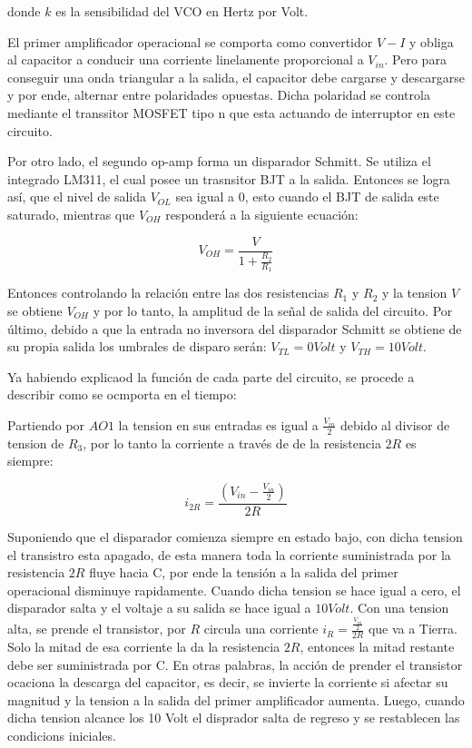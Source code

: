 donde $k$ es la sensibilidad del VCO en Hertz por Volt. 


El primer amplificador operacional se comporta como convertidor $V-I$ y obliga al capacitor a conducir una corriente linelamente proporcional a $V_{in}$. Pero para conseguir una onda triangular a la salida, el capacitor debe cargarse y descargarse y por ende, alternar entre polaridades opuestas. Dicha polaridad se controla mediante el transsitor MOSFET tipo n que esta actuando de interruptor en este circuito. 

Por otro lado, el segundo op-amp forma un disparador Schmitt. Se utiliza el integrado LM311, el cual posee un trasnsitor BJT a la salida. Entonces se logra así, que el nivel de salida $V_{OL}$ sea igual a $0$, esto cuando el BJT de salida este saturado, mientras que $V_{OH}$ responderá a la siguiente ecuación:

\begin{equation}
V_{OH} = \frac{V}{1 + \frac{R_2}{R_1}}
\end{equation}

Entonces controlando la relación entre las dos resistencias $R_1$ y $R_2$ y la tension $V$ se obtiene $V_{OH}$ y por lo tanto, la amplitud de la señal de salida del circuito. Por último, debido a que la entrada no inversora del disparador Schmitt se obtiene de su propia salida los umbrales de disparo serán: $V_{TL} = 0 Volt$ y $V_{TH} = 10 Volt$.


Ya habiendo explicaod la función de cada parte del circuito, se procede a describir como se ocmporta en el tiempo:

Partiendo por $AO1$ la tension en sus entradas es igual a $\frac{V_{in}}{2}$ debido al divisor de tension de $R_3$, por lo tanto la corriente a través de de la resistencia $2R$ es siempre:

\begin{equation}
i_{2R} = \frac{(V_{in} - \frac{V_{in}}{2})}{2R}
\end{equation}

Suponiendo que el disparador comienza siempre en estado bajo, con dicha tension el transistro esta apagado, de esta manera toda la corriente suministrada por la resistencia $2R$ fluye hacia C, por ende la tensión a la salida del primer operacional disminuye rapidamente. Cuando dicha tension se hace igual a cero, el disparador salta y el voltaje a su salida se hace igual a $10 Volt$. Con una tension alta, se prende el transistor, por $R$ circula una corriente $i_R = \frac{\frac{V_{in}}{2}}{2R}$ que va a Tierra. Solo la mitad de esa corriente la da la resistencia $2R$, entonces la mitad restante debe ser suministrada por C. En otras palabras, la acción de prender el transistor ocaciona la descarga del capacitor, es decir, se invierte la corriente si afectar su magnitud y la tension a la salida del primer amplificador aumenta. Luego, cuando dicha tension alcance los 10 Volt el disprador salta de regreso y se restablecen las condicions iniciales. 

